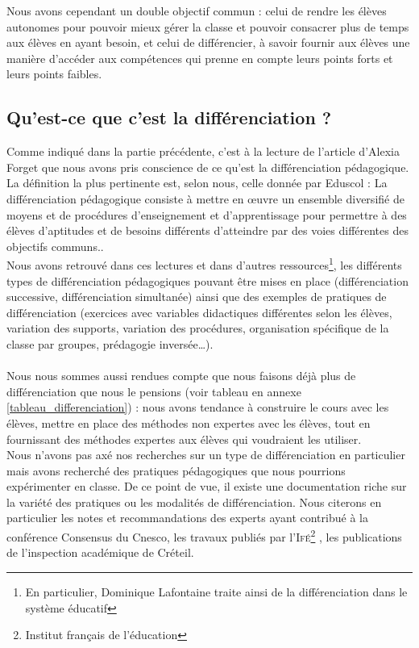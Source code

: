   Nous avons cependant un double objectif commun : celui de rendre les élèves autonomes pour pouvoir mieux gérer la classe et pouvoir consacrer plus de temps aux élèves en ayant besoin, et celui de différencier, à savoir fournir aux élèves une manière d’accéder aux compétences qui prenne en compte leurs points forts et leurs points faibles.


\subsection{Qu'est-ce que c'est la différenciation ?}
Comme indiqué dans la partie précédente, c'est à la lecture de l'article d'Alexia Forget\cite{cnesco_etat_lieux} que nous avons pris conscience de ce qu'est la différenciation pédagogique. La définition la plus pertinente est, selon nous, celle donnée par Eduscol\cite{Eduscol} : \og La différenciation pédagogique consiste à mettre en \oe{}uvre un ensemble diversifié de moyens
et de procédures d’enseignement et d’apprentissage pour permettre à des élèves d’aptitudes
et de besoins différents d’atteindre par des voies différentes des objectifs communs.\fg{}.\\
Nous avons retrouvé dans ces lectures et dans d'autres ressources\footnote{En particulier, Dominique Lafontaine\cite{cnesco_Lafontaine} traite ainsi de la différenciation dans le système éducatif}, les différents types de différenciation pédagogiques pouvant être mises en place (différenciation successive, différenciation simultanée) ainsi que des exemples de pratiques de différenciation (exercices avec variables didactiques différentes selon les élèves, variation des supports, variation des procédures, organisation spécifique de la classe par groupes, prédagogie inversée\ldots).
\paragraph{}Nous nous sommes aussi rendues compte que nous faisons déjà plus de différenciation que nous le pensions (voir tableau en annexe \ref{tableau_differenciation}) : nous avons tendance à construire le cours avec les élèves, mettre en place des méthodes non expertes avec les élèves, tout en fournissant des méthodes expertes aux élèves qui voudraient les utiliser.\\
Nous n'avons pas axé nos recherches sur un type de différenciation en particulier mais avons recherché des pratiques pédagogiques que nous pourrions expérimenter en classe. De ce point de vue, il existe une documentation riche sur la variété des pratiques ou les modalités de différenciation. Nous citerons en particulier les notes et recommandations des experts ayant contribué à la conférence \og Consensus \fg{} du Cnesco\cite{cnesco_notes_experts}\cite{cnesco_synthese}, les travaux publiés par l'\textsc{Ifé}\footnote{Institut français de l'éducation} \cite{ife}, les publications de l'inspection académique de Créteil\cite{IPR_math_mouvement}.

